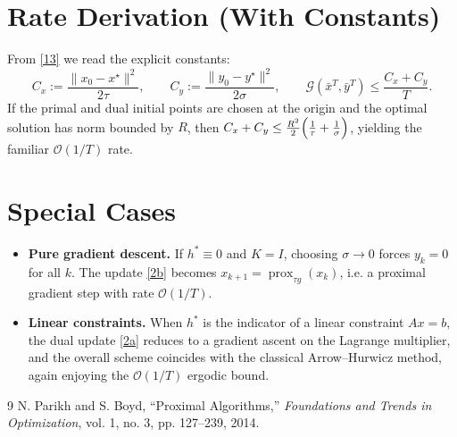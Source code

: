 \documentclass{article}
\newcommand{\prox}{\operatorname{prox}}
\begin{document}
\section*{Rate Derivation (With Constants)}
From \eqref{13} we read the explicit constants:
\[
C_{x}:=\frac{\|x_{0}-x^{\star}\|^{2}}{2\tau},
\qquad
C_{y}:=\frac{\|y_{0}-y^{\star}\|^{2}}{2\sigma},
\qquad
\mathcal G(\bar x^{T},\bar y^{T})\le \frac{C_{x}+C_{y}}{T}.
\]
If the primal and dual initial points are chosen at the origin and the
optimal solution has norm bounded by $R$, then $C_{x}+C_{y}\le
\frac{R^{2}}{2}\Bigl(\frac{1}{\tau}+\frac{1}{\sigma}\Bigr)$, yielding the familiar
$\mathcal O(1/T)$ rate.

\section*{Special Cases}
\begin{itemize}
\item \textbf{Pure gradient descent.}
If $h^{*}\equiv0$ and $K=I$, choosing $\sigma\to0$ forces $y_{k}=0$ for all $k$.
The update \eqref{2b} becomes
$x_{k+1}= \prox_{\tau g}(x_{k})$, i.e. a proximal gradient step with rate
$\mathcal O(1/T)$.
\item \textbf{Linear constraints.}
When $h^{*}$ is the indicator of a linear constraint $Ax=b$, the dual update
\eqref{2a} reduces to a gradient ascent on the Lagrange multiplier, and the
overall scheme coincides with the classical Arrow–Hurwicz method, again
enjoying the $\mathcal O(1/T)$ ergodic bound.
\end{itemize}

\begin{thebibliography}{9}
N. Parikh and S. Boyd, ``Proximal Algorithms,'' \emph{Foundations and Trends in Optimization}, vol. 1, no. 3, pp. 127–239, 2014.
\end{thebibliography}
\end{document}

